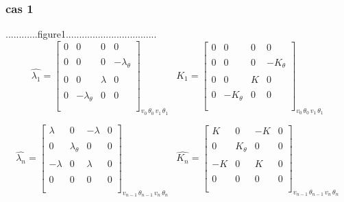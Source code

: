 \documentclass[a4paper,10pt]{report} %
\begin{document}
\subsubsection{cas 1}
............figure1..................................
\[ \widehat{\lambda_1}=\left[ \begin{array}{cccc}
0 &0& 0&0     \\\\
0&0&0&-\lambda_{\theta} \\\\
0&0& \lambda&0    \\\\
0&-\lambda_{\theta}&0&0   \\\\
 \end{array} \right]_{v_0 \, \theta_0 \, v_1 \, \theta_1 \, }
 \,\,\,\,
 \widehat{K_1}=\left[ \begin{array}{cccc}
0 &0& 0&0     \\\\
0&0&0&-K_{\theta} \\\\
0&0& K&0    \\\\
0&-K_{\theta}&0&0   \\\\
 \end{array} \right]_{v_0 \, \theta_0 \, v_1 \, \theta_1 \, }\]
 
  \[ \widehat{\lambda_n}=\left[ \begin{array}{cccc}
\lambda &0& -\lambda&0     \\\\
0&\lambda_{\theta}&0&0 \\\\
-\lambda&0&\lambda&0    \\\\
0&0&0&0   \\\\
 \end{array} \right]_{v_{n-1} \, \theta_{n-1} \, v_{n} \, \theta_{n} \, }
 \,\,\,\,
 \widehat{K_n}=\left[ \begin{array}{cccc}
K &0& -K&0     \\\\
0&K_{\theta}&0&0 \\\\
-K&0& K&0    \\\\
0&0&0&0   \\\\
 \end{array} \right]_{v_{n-1} \, \theta_{n-1} \, v_{n} \, \theta_{n} \, }\]
\end{document}
